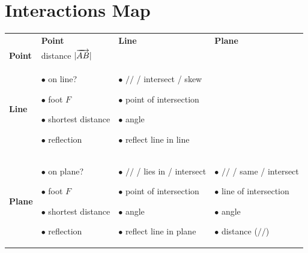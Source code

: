 \section{Interactions Map}
\begin{center}\renewcommand{\arraystretch}{1.25}\small
\begin{tabular}{|>{\centering\arraybackslash}m{1.3cm}|p{4.4cm}|p{4.4cm}|p{4.4cm}|}\hline
& \centering\textbf{Point} & \centering\textbf{Line} & \centering\arraybackslash\textbf{Plane}\\\Xhline{2pt}
\textbf{Point}& distance $|\overrightarrow{AB}|$ & \cellcolor{black!4}& \cellcolor{black!4}\\\hline
\textbf{Line}&
$\bullet$ on line? \hfill\fhl{\sref{15.3}}\par
$\bullet$ foot $F$ \hfill\fhl{\sref{15.5}}\par
$\bullet$ shortest distance \hfill\fhl{\sref{15.5}}\par
$\bullet$ reflection \hfill\fhl{\sref{15.5}}&
$\bullet$ $/\!/$ / intersect / skew \hfill\fhl{\sref{15.6}}\par
$\bullet$ point of intersection \hfill\fhl{\sref{15.6}}\par
$\bullet$ angle \hfill\fhl{\sref{15.8}}\par
$\bullet$ reflect line in line \hfill\fhl{\sref{15.9}}& \cellcolor{black!4}\\\hline
\textbf{Plane}&
$\bullet$ on plane? \hfill\fhl{\sref{15.3}}\par
$\bullet$ foot $F$ \hfill\fhl{\sref{15.5}}\par
$\bullet$ shortest distance \hfill\fhl{\sref{15.5}}\par
$\bullet$ reflection \hfill\fhl{\sref{15.5}}&
$\bullet$ $/\!/$ / lies in / intersect \hfill\fhl{\sref{15.6}}\par
$\bullet$ point of intersection \hfill\fhl{\sref{15.6}}\par
$\bullet$ angle \hfill\fhl{\sref{15.8}}\par
$\bullet$ reflect line in plane \hfill\fhl{\sref{15.9}}&
$\bullet$ $/\!/$ / same / intersect \hfill\fhl{\sref{15.6}}\par
$\bullet$ line of intersection \hfill\fhl{\sref{15.6}}\par
$\bullet$ angle \hfill\fhl{\sref{15.8}}\par
$\bullet$ distance ($/\!/$) \hfill\fhl{\sref{15.10}}\\\hline
\end{tabular}\end{center}
